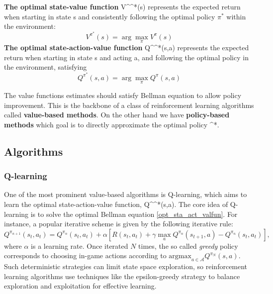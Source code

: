 \documentclass[
]{article}
\def\({}%
\def\){}%
\numberwithin{equation}{section}
\begin{document}
\textbf{The optimal state-value function} \(V^{\pi^*}(s)\) represents the expected return when starting in state \(s\) and consistently following the optimal policy $\pi^*$ within the environment: \begin{equation}
 V^{\pi^*}(s) = \arg \max_{\pi} V^{\pi}(s) 
\label{opt_valfun}
\end{equation} \textbf{The optimal state-action-value function}
\(Q^{\pi^*}(s,a)\) represents the expected return when starting in state
\(s\) and acting a, and following the optimal policy in the environment, satisfying
\begin{equation}
Q^{\pi^*}(s,a) = \arg \max_{\pi} Q^{\pi}(s,a)
\label{opt_sta_act_valfun}
\end{equation}


The value functions estimates should satisfy Bellman equation to allow policy improvement. This is the backbone of a class of reinforcement
learning algorithms called \textbf{value-based methods}. 
On
the other hand we have \textbf{policy-based methods} which goal is to
directly approximate the optimal policy \(\pi^*\).



\hypertarget{Algorithms}{%
\subsection{Algorithms}\label{Algorithms}}

\hypertarget{Q-learning}{%
\subsubsection{Q-learning}\label{Q-learning}}


One of the most prominent value-based algorithms is Q-learning, which
aims to learn the optimal state-action-value function, \(Q^{\pi^*}(s,a)\). 
The core idea
of Q-learning is to solve the optimal Bellman equation \eqref{opt_sta_act_valfun}. For instance, a popular iterative scheme is given by the following iterative rule: 
\begin{equation} 
Q^{\pi_{n+1}}(s_t,a_t) = Q^{\pi_{n}}(s_t,a_t) + \alpha[R(s_{t},a_t) + \gamma \max_{a} Q^{\pi_{n}}(s_{t+1},a) -Q^{\pi_{n}}(s_t,a_t)],
\label{iter_bell}
\end{equation} where $\alpha$ is a learning rate. Once iterated $N$ times, the so called \textit{greedy} policy corresponds to choosing in-game actions according to $\text{argmax}_{a \in \mathcal{A}} Q^{\pi_{N}}(s,a)$.
Such deterministic strategies can limit state space exploration, so reinforcement learning algorithms use techniques like the epsilon-greedy strategy to balance exploration and exploitation for effective learning.
\end{document}
